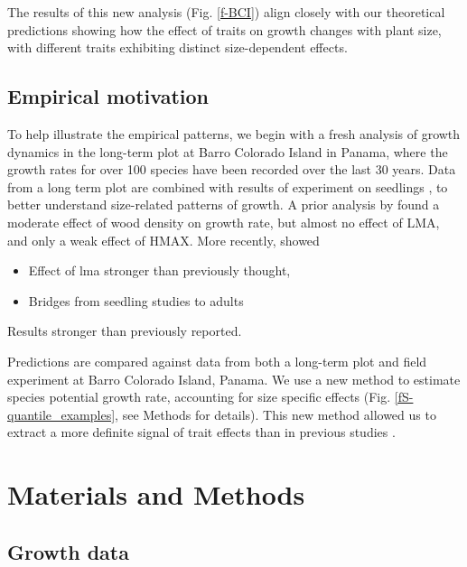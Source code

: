 \documentclass[12pt, a4paper]{article}
\begin{document}
The results of this new analysis
(Fig. \ref{f-BCI}) align closely with our theoretical predictions  showing how the effect of traits on growth
changes with plant size, with different traits exhibiting distinct
size-dependent effects.



\subsection{Empirical motivation}\label{fresh-empirical-motivation}

To help illustrate the empirical patterns, we begin with a fresh analysis of
growth dynamics in the long-term plot at Barro Colorado Island in Panama,
where the growth rates for over 100 species have been recorded over the last
30 years. Data from a long term plot \citep{condit-2012} are combined
with results of experiment on seedlings \citep{kitajima-2013}, to better understand
size-related patterns of growth. A prior analysis by
 \citet{wright-2010} found a moderate effect of wood density on
growth rate, but almost no effect of LMA, and only a weak effect of HMAX. More recently,
 \citet{ruger-2012} showed

\begin{itemize}
\itemsep1pt\parskip0pt
\item
  Effect of lma stronger than previously thought,
\item
  Bridges from seedling studies to adults
\end{itemize}

Results stronger than previously reported.

Predictions
are compared against data from both a long-term
plot \citep{condit-2012} and field
experiment \citep{kitajima-2013} at Barro Colorado Island, Panama.
We use a new method to estimate species potential growth rate,
accounting for size specific effects (Fig. \ref{fS-quantile_examples},
see Methods for details). This new method allowed us to extract a more
definite signal of trait effects than in previous
studies \citep{wright-2010}.

\section{Materials and Methods}\label{materials-and-methods}

\subsection{Growth data}\label{growth-data}
\end{document}
